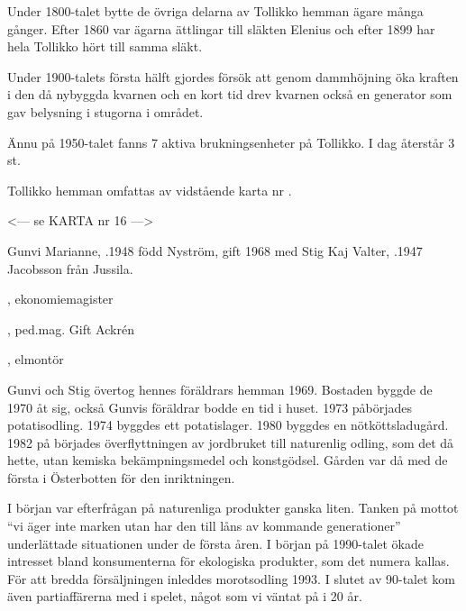 Under 1800-talet bytte de övriga delarna av Tollikko hemman ägare många gånger. Efter 1860 var ägarna ättlingar till släkten Elenius och efter 1899 har hela Tollikko hört till samma släkt.

Under 1900-talets första hälft gjordes försök att genom dammhöjning öka kraften i den då nybyggda kvarnen och en kort tid drev kvarnen också en generator som gav belysning i stugorna i området.

Ännu på 1950-talet fanns 7 aktiva brukningsenheter på Tollikko. I dag återstår 3 st.

Tollikko hemman omfattas av vidstående karta nr .


<--- se KARTA nr 16 --->








Gunvi Marianne, .1948 född Nyström, gift 1968 med Stig Kaj Valter, .1947 Jacobsson från Jussila.
\begin{jhchildren}
  \item {}, ekonomiemagister
  \item {}, ped.mag. Gift Ackrén
  \item {}, elmontör
\end{jhchildren}
Gunvi och Stig övertog hennes föräldrars hemman 1969. Bostaden 	byggde de 1970 åt sig, också Gunvis föräldrar bodde en tid i huset. 1973 påbörjades potatisodling. 1974 byggdes ett potatislager. 1980 byggdes en nötköttsladugård. 1982 på börjades överflyttningen av jordbruket till naturenlig odling, som det då hette, utan kemiska bekämpningsmedel och konstgödsel. Gården var då med de första i Österbotten för den inriktningen.

I början var efterfrågan på naturenliga produkter ganska liten. Tanken på mottot ``vi äger inte marken utan har den till låns av kommande generationer'' underlättade situationen under de första åren. I början på 1990-talet ökade intresset bland konsumenterna för ekologiska produkter, som det numera kallas. För att bredda försäljningen inleddes morotsodling 1993. I slutet av 90-talet kom även partiaffärerna med i spelet, något som vi väntat på i 20 år.


